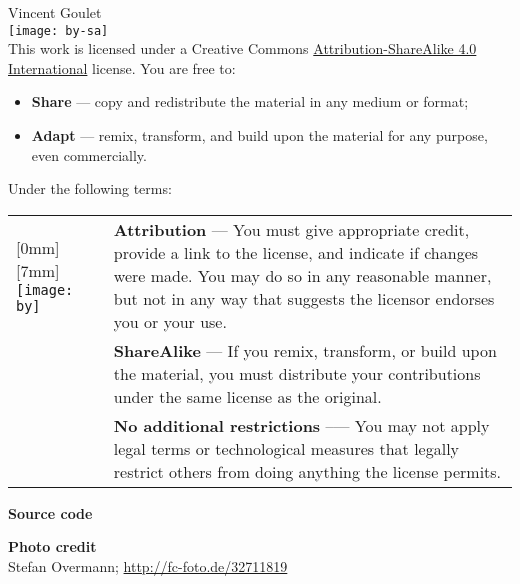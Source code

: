 
\begin{frame}[t,plain,fragile=singleslide]
  \tiny
  \vspace*{10mm}

  \begin{adjustwidth}{15mm}{15mm}
    {\textcopyright} {\year} Vincent Goulet \\[4mm]

    \texttt{[image: by-sa]} \\%

    This work is licensed under a Creative Commons
    \href{http://creativecommons.org/licenses/by-sa/4.0/deed.en}{%
      Attribution-ShareAlike 4.0 International}
    license. You are free to:
    \begin{itemize}
    \item \textbf{Share} --- copy and redistribute the material in any
      medium or format;
    \item \textbf{Adapt} --- remix, transform, and build upon the
      material for any purpose, even commercially.
    \end{itemize}
    Under the following terms: \vspace*{2mm}

    \begin{tabularx}{\linewidth}{@{}lX@{}}
      \raisebox{-5.5mm}[0mm][7mm]{%
        \texttt{[image: by]}} &
      \textbf{Attribution} --- You must give appropriate credit,
      provide a link to the license, and indicate if changes were
      made. You may do so in any reasonable manner, but not in any way
      that suggests the licensor endorses you or your use. \\
      \raisebox{-5.5mm}{\texttt{[image: sa]}}
      & \textbf{ShareAlike} --- If you remix, transform, or build upon
      the material, you must distribute your contributions under the
      same license as the original. \\
      & \textbf{No additional restrictions} --— You may not apply
      legal terms or technological measures that legally restrict
      others from doing anything the license permits.
    \end{tabularx}
    \vspace{5mm}

    \textbf{Source code} \\

    \textbf{Photo credit} \\
    Stefan Overmann; \url{http://fc-foto.de/32711819}
  \end{adjustwidth}
\end{frame}

